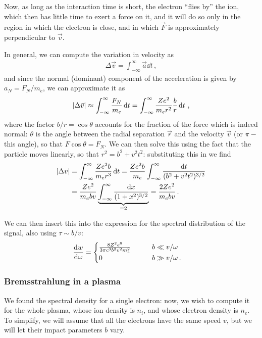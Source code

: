 \documentclass[main.tex]{subfiles}
\begin{document}
Now, as long as the interaction time is short, the electron ``flies by'' the ion, which then has little time to exert a force on it, and it will do so only in the region in which the electron is close, and in which \(\vec{F}\) is approximately perpendicular to \(\vec{v}\). 

In general, we can compute the variation in velocity as 
%
\begin{align}
\Delta \vec{v} = \int_{- \infty }^{\infty} \vec{a} \dd{t}
\,,
\end{align}
%
and since the normal (dominant) component of the acceleration is given by \(a_N = F_N / m_e \), we can approximate it as
%
\begin{align}
\abs{\Delta \vec{v}} \approx \int_{- \infty }^{\infty} \frac{F_N}{m_e} \dd{t}
= \int_{- \infty }^{\infty}
\frac{Ze^2}{m_e r^2} \frac{b}{r} \dd{t}
\,,
\end{align}
%
where the factor \(b/r = \cos \theta \) accounts for the fraction of the force which is indeed normal: \(\theta \) is the angle between the radial separation \(\vec{r}\) and the velocity \(\vec{v}\) (or \(\pi - \) this angle), so that \(F \cos \theta = F_N\). 
We can then solve this using the fact that the particle moves linearly, so that \(r^2= b^2 + v^2 t^2\): substituting this in we find 
%
\begin{align}
\abs{\Delta v} &= \int _{- \infty }^{\infty} \frac{Ze^2b}{m_e r^3} \dd{t}
= \frac{Z e^2 b}{m_e} \int  _{- \infty }^{\infty} \frac{ \dd{t}}{(b^2 + v^2 t^2)^{3/2}}  \\
&= \frac{Ze^2}{m_e bv } \underbrace{\int _{- \infty }^{\infty} \frac{ \dd{x}}{(1 + x^2)^{3/2}}}_{= 2} = \frac{2 Z e^2}{m_e bv}
\,.
\end{align}

We can then insert this into the expression for the spectral distribution of the signal, also using \(\tau \sim b/v\): 
%
\begin{align}
\dv{w}{\omega } 
&= 
\begin{cases}
    \frac{8 Z^2e^6}{3 \pi c^3 b^2 v^2 m_e^2 }  &\qquad b \ll v/\omega   \\
    0 &\qquad b \gg v/\omega \,.
\end{cases}
\end{align}

\subsubsection{Bremsstrahlung in a plasma}

We found the spectral density for a single electron: now, we wish to compute it for the whole plasma, whose ion density is \(n_i\), and whose electron density is \(n_e\).
To simplify, we will assume that all the electrons have the same speed \(v\), but we will let their impact parameters \(b\) vary.
\end{document}

